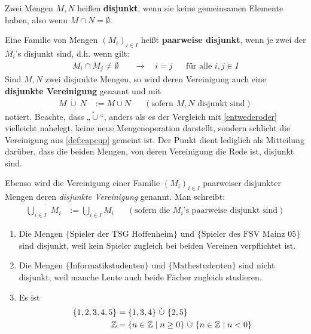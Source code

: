 \begin{de}[Disjunktheit] \label{def:disjunkt} 
    Zwei Mengen $M,N$ heißen \textbf{disjunkt}, wenn sie keine gemeinsamen Elemente haben, also wenn $M\cap N=\emptyset$.

    Eine Familie von Mengen $(M_i)_{i\in I}$ heißt \textbf{paarweise disjunkt}, wenn je zwei der $M_i$'s disjunkt sind, d.h. wenn gilt:
    \begin{align*}
        M_i\cap M_j \neq  \emptyset \quad& \to\quad i=j &&\text{für alle $i,j\in I$}
    \end{align*}
    Sind $M,N$ zwei disjunkte Mengen, so wird deren Vereinigung auch eine \textbf{disjunkte Vereinigung} genannt und mit
    \begin{align*}
        M\ \dot\cup\ N & := M\cup N && (\text{sofern $M,N$ disjunkt sind})
    \end{align*}
    notiert. Beachte, dass „$\dot\cup$“, anders als es der Vergleich mit \cref{entwederoder} vielleicht nahelegt, keine neue Mengenoperation darstellt, sondern schlicht die Vereinigung aus \cref{def:capcup} gemeint ist. Der Punkt dient lediglich als Mitteilung darüber, dass die beiden Mengen, von deren Vereinigung die Rede ist, disjunkt sind.

    Ebenso wird die Vereinigung einer Familie $(M_i)_{i\in I}$ paarweiser disjunkter Mengen deren \emph{disjunkte Vereinigung} genannt. Man schreibt:
    \begin{align*}
        \dot{\bigcup_{i\in I}}\ M_i & := \bigcup_{i\in I} M_i && (\text{sofern die $M_i$'s paarweise disjunkt sind})
    \end{align*}
\end{de}


\begin{bsp} \label{bsp:disjunkt} \quad
    \begin{enumerate}
        \item Die Mengen $\{\text{Spieler der TSG Hoffenheim}\}$ und $\{\text{Spieler des FSV Mainz 05}\}$ sind disjunkt, weil kein Spieler zugleich bei beiden Vereinen verpflichtet ist.
        \item Die Mengen $\{\text{Informatikstudenten}\}$ und $\{\text{Mathestudenten}\}$ sind nicht disjunkt, weil manche Leute auch beide Fächer zugleich studieren.
        \item Es ist
        \begin{align*}
        \{1,2,3,4,5\} & = \{1,3,4\}\ \dot\cup\ \{2,5\} \\
        \mathbb Z & = \{n\in \mathbb Z\mid n\ge 0\} \ \dot\cup\ \{n\in \mathbb Z\mid n<0\}
        \end{align*}
    \end{enumerate}
\end{bsp}



